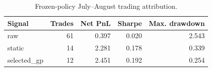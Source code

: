 \begin{table}[htbp]
\centering
\caption{Frozen-policy July--August trading attribution.}
\label{tab:external-trading-attribution}
\begin{tabular}{lrrrr}
\toprule
Signal & Trades & Net PnL & Sharpe & Max. drawdown \\
\midrule
raw & 61 & 0.397 & 0.020 & 2.543 \\
static & 14 & 2.281 & 0.178 & 0.339 \\
selected\_gp & 12 & 2.451 & 0.192 & 0.254 \\
\bottomrule
\end{tabular}
\end{table}
